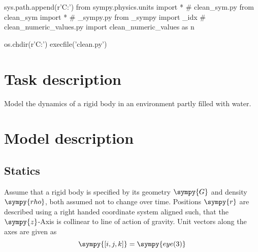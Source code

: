 \documentclass[12pt,a4paper]{article}
\newcommand{\s}{\sympy}
\begin{document}
\tableofcontents

\begin{sympycode}
sys.path.append(r'C:\Users\Murad\evrythg')
from sympy.physics.units import *
# clean_sym.py
from clean_sym import *
# _sympy.py 
from _sympy import _idx
# clean_numeric_values.py
import clean_numeric_values as n
\end{sympycode}

\begin{pythoncode}
os.chdir(r'C:\Users\Murad\evrythg')
execfile('clean.py')
\end{pythoncode}


\section{Task description}
Model the dynamics of a rigid body in an environment partly filled with water.
\section{Model description}
\subsection{Statics}
Assume that a rigid body is specified by its geometry $\s{G}$ and density $\s{rho}$, both assumed not to change over time.    Positions $\s{r}$ are described using a right handed coordinate system aligned such, that the $\s{z}$-Axis is collinear to line of action of gravity.  Unit vectors along the axes are given as
\begin{equation*}
\s{[i, j, k]} = \s{eye(3)}
\end{equation*}
\end{document}
